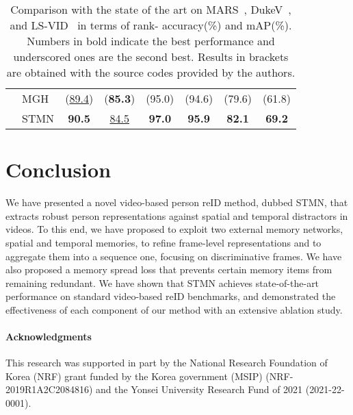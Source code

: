 \documentclass[10pt,twocolumn,letterpaper]{article}
\begin{document}
\begin{table}[!t]
{\begin{tabular}{clcccccc}
				& MGH~\cite{yan2020learning}			& (\underline{89.4}) & (\textbf{85.3}) & (95.0) & (94.6) & (79.6) & (61.8) \\
				& STMN 								& \textbf{90.5} & \underline{84.5} & \textbf{97.0} & \textbf{95.9} & \textbf{82.1} & \textbf{69.2} \\
				\hline
				\end{tabular}
			}
			\vspace{+0.1cm}
			\caption{Comparison with the state of the art on MARS~\cite{zheng2016mars}, DukeV~\cite{wu2018exploit}, and LS-VID~\cite{li2019global} in terms of rank- accuracy(\%) and mAP(\%). Numbers in bold indicate the best performance and underscored ones are the second best. Results in brackets are obtained with the source codes provided by the authors.}
			\label{table:sota}
			\vspace{-0.4cm}
		\end{table}
								
\section{Conclusion}
\vspace{-0.1cm}
We have presented a novel video-based person reID method, dubbed STMN, that extracts robust person representations against spatial and temporal distractors in videos. To this end, we have proposed to exploit two external memory networks, spatial and temporal memories, to refine frame-level representations and to aggregate them into a sequence one, focusing on discriminative frames. We have also proposed a memory spread loss that prevents certain memory items from remaining redundant. We have shown that STMN achieves state-of-the-art performance on standard video-based reID benchmarks, and demonstrated the effectiveness of each component of our method with an extensive ablation study.

\paragraph{Acknowledgments}
This research was supported in part by the National Research Foundation of Korea (NRF) grant funded by the Korea government (MSIP) (NRF-2019R1A2C2084816) and the Yonsei University Research Fund of 2021 (2021-22-0001).
\newpage

{\small


}
\end{document}
